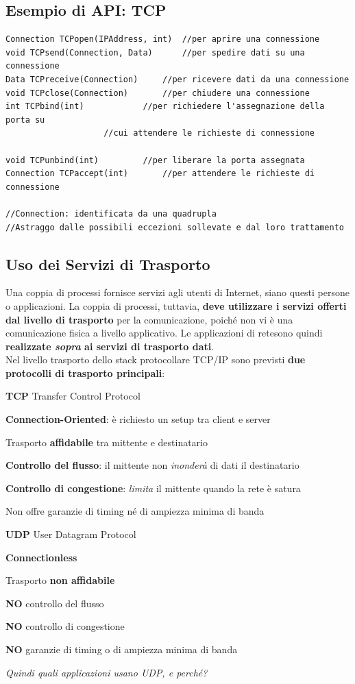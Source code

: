 \documentclass[10pt]{article}
\begin{document}
\subsection{Esempio di API: TCP}
\begin{lstlisting}
Connection TCPopen(IPAddress, int)	//per aprire una connessione
void TCPsend(Connection, Data)		//per spedire dati su una connessione
Data TCPreceive(Connection)		//per ricevere dati da una connessione
void TCPclose(Connection)		//per chiudere una connessione
int TCPbind(int)			//per richiedere l'assegnazione della porta su
					//cui attendere le richieste di connessione

void TCPunbind(int)			//per liberare la porta assegnata
Connection TCPaccept(int)		//per attendere le richieste di connessione

//Connection: identificata da una quadrupla
//Astraggo dalle possibili eccezioni sollevate e dal loro trattamento
\end{lstlisting}
\pagebreak
\subsection{Uso dei Servizi di Trasporto}
Una coppia di processi fornisce servizi agli utenti di Internet, siano questi persone o applicazioni. La coppia di processi, tuttavia, \textbf{deve utilizzare i servizi offerti dal livello di trasporto} per la comunicazione, poiché non vi è una comunicazione fisica a livello applicativo. Le applicazioni di retesono quindi \textbf{realizzate \textit{sopra} ai servizi di trasporto dati}.\\
Nel livello trasporto dello stack protocollare TCP/IP sono previsti \textbf{due protocolli di trasporto principali}:
\begin{list}{}{}
\item \textbf{TCP} Transfer Control Protocol
\begin{list}{}{}
\item \textbf{Connection-Oriented}: è richiesto un setup tra client e server
\item Trasporto \textbf{affidabile} tra mittente e destinatario
\item \textbf{Controllo del flusso}: il mittente non \textit{inonderà} di dati il destinatario
\item \textbf{Controllo di congestione}: \textit{limita} il mittente quando la rete è satura
\item Non offre garanzie di timing né di ampiezza minima di banda
\end{list}
\item \textbf{UDP} User Datagram Protocol
\begin{list}{}{}
\item \textbf{Connectionless}
\item Trasporto \textbf{non affidabile}
\item \textbf{NO} controllo del flusso
\item \textbf{NO} controllo di congestione
\item \textbf{NO} garanzie di timing o di ampiezza minima di banda
\item \textit{Quindi quali applicazioni usano UDP, e perché?}
\end{list}
\end{list}
\end{document}
